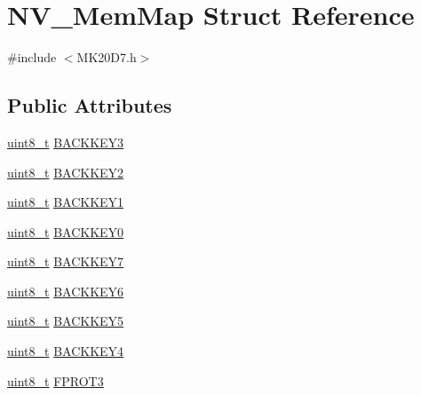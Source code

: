 \hypertarget{struct_n_v___mem_map}{}\section{N\+V\+\_\+\+Mem\+Map Struct Reference}
\label{struct_n_v___mem_map}


{\ttfamily \#include $<$M\+K20\+D7.\+h$>$}

\subsection*{Public Attributes}
\begin{DoxyCompactItemize}
\item 
\hyperlink{_p_e___types_8h_aba7bc1797add20fe3efdf37ced1182c5}{uint8\+\_\+t} \hyperlink{struct_n_v___mem_map_a836e107cd6936ce8acd9279af7e9657e}{B\+A\+C\+K\+K\+E\+Y3}
\item 
\hyperlink{_p_e___types_8h_aba7bc1797add20fe3efdf37ced1182c5}{uint8\+\_\+t} \hyperlink{struct_n_v___mem_map_af746c853a18c5e8910e556b32073f938}{B\+A\+C\+K\+K\+E\+Y2}
\item 
\hyperlink{_p_e___types_8h_aba7bc1797add20fe3efdf37ced1182c5}{uint8\+\_\+t} \hyperlink{struct_n_v___mem_map_ab43748ac2b6d99cef1a62072d17a707b}{B\+A\+C\+K\+K\+E\+Y1}
\item 
\hyperlink{_p_e___types_8h_aba7bc1797add20fe3efdf37ced1182c5}{uint8\+\_\+t} \hyperlink{struct_n_v___mem_map_ad6d790fea8e791ef5cda3685fe306a08}{B\+A\+C\+K\+K\+E\+Y0}
\item 
\hyperlink{_p_e___types_8h_aba7bc1797add20fe3efdf37ced1182c5}{uint8\+\_\+t} \hyperlink{struct_n_v___mem_map_a398eb38f0e2b4a9da6562e42ed7a40b3}{B\+A\+C\+K\+K\+E\+Y7}
\item 
\hyperlink{_p_e___types_8h_aba7bc1797add20fe3efdf37ced1182c5}{uint8\+\_\+t} \hyperlink{struct_n_v___mem_map_aa2013cbf54568a1ed52cd6205b4b0b35}{B\+A\+C\+K\+K\+E\+Y6}
\item 
\hyperlink{_p_e___types_8h_aba7bc1797add20fe3efdf37ced1182c5}{uint8\+\_\+t} \hyperlink{struct_n_v___mem_map_a46e84393478a41f6958c4f382cad11b7}{B\+A\+C\+K\+K\+E\+Y5}
\item 
\hyperlink{_p_e___types_8h_aba7bc1797add20fe3efdf37ced1182c5}{uint8\+\_\+t} \hyperlink{struct_n_v___mem_map_ae4e87676d4d9881d1d60af4176b6d6f5}{B\+A\+C\+K\+K\+E\+Y4}
\item 
\hyperlink{_p_e___types_8h_aba7bc1797add20fe3efdf37ced1182c5}{uint8\+\_\+t} \hyperlink{struct_n_v___mem_map_a944089b14b23cff0b4f8a16e13f8b9d6}{F\+P\+R\+O\+T3}

\end{DoxyCompactItemize}
